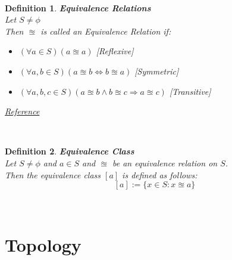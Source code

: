 \documentclass[12pt]{extarticle}
\theoremstyle{plain}
\theoremstyle{plain}
\theoremstyle{plain}
\theoremstyle{Definition}
\newtheorem{def.}{Definition}[section]
\theoremstyle{Definition}
\theoremstyle{plain}
\newcommand{\cut}[0]{\noindent\framebox[\linewidth]{\rule{\linewidth}{2pt}}\\}
\begin{document}
\cut
\begin{def.} \textbf{Equivalence Relations} \\
	Let $S \not = \phi$ \\ 
	Then $\approxeq$ is called an Equivalence Relation if: 
	\begin{itemize}
		\item $(\forall a \in S)(a \approxeq a)$ \hfill [Reflexive]
		\item $(\forall a,b \in S)(a \approxeq b \Leftrightarrow b \approxeq a)$ \hfill [Symmetric]
		\item $(\forall a,b,c \in S)(a \approxeq b \wedge b \approxeq c \Rightarrow a \approxeq c)$ \hfill [Transitive] 
	\end{itemize}
\href{https://en.wikipedia.org/wiki/Equivalence_relation}{Reference}
\end{def.}
\cut
\begin{def.} \textbf{Equivalence Class} \\
	Let $S \not = \phi$ and $a \in S$ and $\approxeq$ be an equivalence relation on $S$. \\
	Then the equivalence class $[a]$ is defined as follows: 
		$$[a] := \{x \in S : x \approxeq a\}$$
\end{def.}
\cut
\section{Topology}
\end{document}
